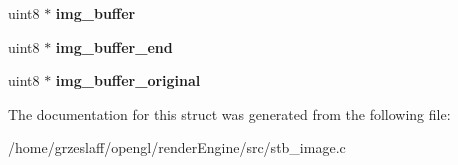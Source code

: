 \begin{DoxyCompactItemize}
\item 
\hypertarget{structstbi_aace36d5487a596bea5faa0aef0398ac8}{uint8 $\ast$ {\bfseries img\-\_\-buffer}}\label{structstbi_aace36d5487a596bea5faa0aef0398ac8}

\item 
\hypertarget{structstbi_a55f78565e605f1784d47fc9acea475f3}{uint8 $\ast$ {\bfseries img\-\_\-buffer\-\_\-end}}\label{structstbi_a55f78565e605f1784d47fc9acea475f3}

\item 
\hypertarget{structstbi_a261be6edda817862e623972b21b4f965}{uint8 $\ast$ {\bfseries img\-\_\-buffer\-\_\-original}}\label{structstbi_a261be6edda817862e623972b21b4f965}

\end{DoxyCompactItemize}


The documentation for this struct was generated from the following file\-:\begin{DoxyCompactItemize}
\item 
/home/grzeslaff/opengl/render\-Engine/src/stb\-\_\-image.\-c\end{DoxyCompactItemize}
